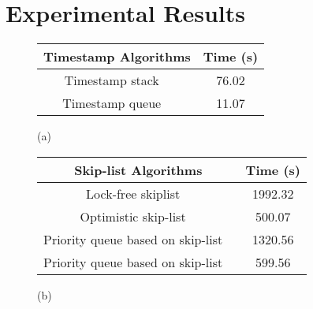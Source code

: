 \section{Experimental Results}
\label{section:experiments}
\newcommand{\emm}{(emm)}
\begin{figure}[]
\center



\begin{tabular}{|c | c | }
  \hline
   \textsf{\textbf{{Timestamp Algorithms}}} &  \textsf{\textbf{{Time (s)}}} \\
\hline
\hline
\textsf{Timestamp stack  ~\cite{MS:QueueAlgorithms}}\;\;\;\;\;\;  & \textsf{76.02} \\
\hline
\textsf{Timestamp queue  ~\cite{MS:QueueAlgorithms}}& \textsf{11.07} \\
\hline
\end{tabular}

\vspace*{0.1cm}

(a)
\\
\vspace*{0.5cm}

\begin{tabular}{|c | c | }
  \hline
   \textsf{\textbf{{Skip-list Algorithms}}} &  \textsf{\textbf{{Time (s)}}} \\
\hline
\hline
\;\;\;\;\textsf{Lock-free skiplist   ~\cite{ArtOfMpP}}\;\;\;\;\;\;  & \textsf{1992.32} \\
\hline
\textsf{Optimistic skip-list  ~\cite{MS:QueueAlgorithms}}& \textsf{500.07} \\
\hline 
\textsf{Priority queue based on skip-list  ~\cite{Shavit:ElimQueue}}  &  \textsf{1320.56} \\
\hline
\textsf{Priority queue based on skip-list  ~\cite{Shavit:ElimQueue}}  &  \textsf{599.56} \\
\hline
\end{tabular}

\vspace*{0.1cm}

(b)
\\
\vspace*{0.5cm}



\end{figure}
